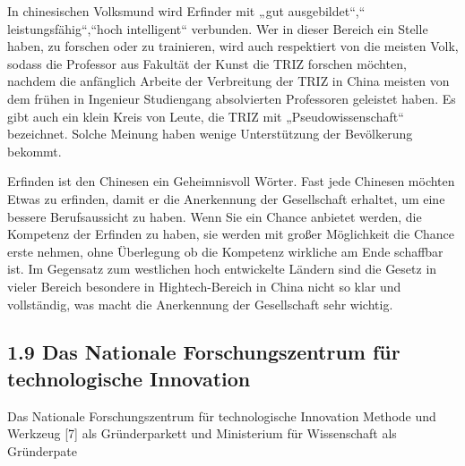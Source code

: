 \documentclass[11pt,a4paper]{article}
\begin{document}
In chinesischen Volksmund wird Erfinder mit „gut ausgebildet“,“
leistungsfähig“,“hoch intelligent“ verbunden. Wer in dieser Bereich ein Stelle
haben, zu forschen oder zu trainieren, wird auch respektiert von die meisten
Volk, sodass die Professor aus Fakultät der Kunst die TRIZ forschen möchten,
nachdem die anfänglich Arbeite der Verbreitung der TRIZ in China  meisten von
dem frühen in Ingenieur Studiengang absolvierten Professoren geleistet
haben. Es gibt auch ein klein Kreis von Leute, die TRIZ mit
„Pseudowissenschaft“  bezeichnet.  Solche Meinung haben wenige Unterstützung
der Bevölkerung bekommt. 

Erfinden ist den Chinesen ein Geheimnisvoll Wörter. Fast jede Chinesen möchten
Etwas zu erfinden, damit er die Anerkennung der Gesellschaft erhaltet, um eine
bessere Berufsaussicht zu haben. Wenn Sie ein Chance anbietet werden, die
Kompetenz der Erfinden zu haben, sie werden mit großer Möglichkeit die Chance
erste nehmen, ohne Überlegung ob die Kompetenz wirkliche am Ende schaffbar
ist. Im Gegensatz zum westlichen hoch entwickelte Ländern sind die Gesetz in
vieler Bereich besondere in Hightech-Bereich in China nicht so klar und
vollständig, was macht die Anerkennung der Gesellschaft sehr wichtig. 

\subsection{1.9 Das Nationale Forschungszentrum für technologische Innovation}

Das Nationale Forschungszentrum für technologische Innovation Methode und
Werkzeug [7] als Gründerparkett und Ministerium für Wissenschaft als
Gründerpate
\end{document}
